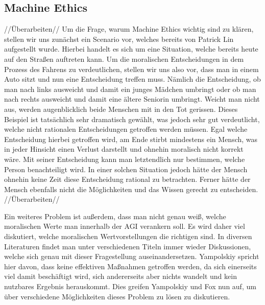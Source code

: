         \subsection{Machine Ethics}
            //Überarbeiten//
            Um die Frage, warum Machine Ethics wichtig sind zu klären, stellen wir uns zunächst ein
            Scenario vor, welches bereits von Patrick Lin aufgestellt wurde. \cite[p. 70]{maurer_gerdes_lenz_winner_2015}
            Hierbei handelt es sich um eine Situation, welche bereits heute auf den
            Straßen auftreten kann. Um die moralischen Entscheidungen in dem Prozess des Fahrens zu
            verdeutlichen, stellen wir uns also vor, dass man in einem Auto sitzt und nun eine
            Entscheidung treffen muss. Nämlich die Entscheidung, ob man nach links ausweicht und damit
            ein junges Mädchen umbringt oder ob man nach rechts ausweicht und damit eine ältere
            Seniorin umbringt. Weicht man nicht aus, werden augenblicklich beide Menschen mit in den
            Tot gerissen. Dieses Beispiel ist tatsächlich sehr dramatisch gewählt, was jedoch sehr gut
            verdeutlicht, welche nicht rationalen Entscheidungen getroffen werden müssen. Egal welche
            Entscheidung hierbei getroffen wird, am Ende stirbt mindestens ein Mensch, was in jeder
            Hinsicht einen Verlust darstellt und ohnehin moralisch nicht korrekt wäre. \cite[p. 70]{maurer_gerdes_lenz_winner_2015}
            Mit seiner Entscheidung kann man letztendlich nur bestimmen, welche Person benachteiligt
            wird. In einer solchen Situation jedoch hätte der Mensch ohnehin keine Zeit diese Entscheidung
            rational zu betrachten. Ferner hätte der Mensch ebenfalls nicht die Möglichkeiten und
            das Wissen gerecht zu entscheiden.
            //Überarbeiten//

            Ein weiteres Problem ist außerdem, dass man nicht genau weiß, welche moralischen Werte man
            innerhalb der AGI verankern soll.\cite[p. 1]{yampolskiy2013safety} Es wird daher viel
            diskutiert, welche moralischen Wertvorstellungen die richtigen sind. In diversen Literaturen
            findet man unter verschiedenen Titeln immer wieder Diskussionen, welche sich genau mit dieser
            Fragestellung auseinandersetzen. Yampolskiy spricht hier davon, dass keine effektiven
            Maßnahmen getroffen werden, da sich einerseits viel damit beschäftigt wird, sich andererseits
            aber nichts wandelt und kein nutzbares Ergebnis herauskommt.\cite[p. 1]{yampolskiy2013safety}
            Dies greifen Yampolskiy und Fox nun auf, um über verschiedene Möglichkeiten dieses Problem zu
            lösen zu diskutieren.

